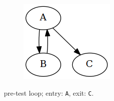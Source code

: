 \begin{figure}[htbp]
	\centering
	\begin{subfigure}[ht]{0.32\textwidth}
		\centering
		\begin{subfigure}[ht]{0.45\textwidth}
			
		\end{subfigure}
		\begin{subfigure}[ht]{0.50\textwidth}
			\includegraphics[width=\textwidth]{inc/primitives/pre_loop.png}
		\end{subfigure}
		\caption{pre-test loop; entry: \texttt{A}, exit: \texttt{C}.}
	\end{subfigure}
	\qquad
	\begin{subfigure}[ht]{0.30\textwidth}
		\centering
		\begin{subfigure}[ht]{0.50\textwidth}
			
		\end{subfigure}
		\begin{subfigure}[ht]{0.35\textwidth}

\end{subfigure}
\end{subfigure}
\end{figure}
